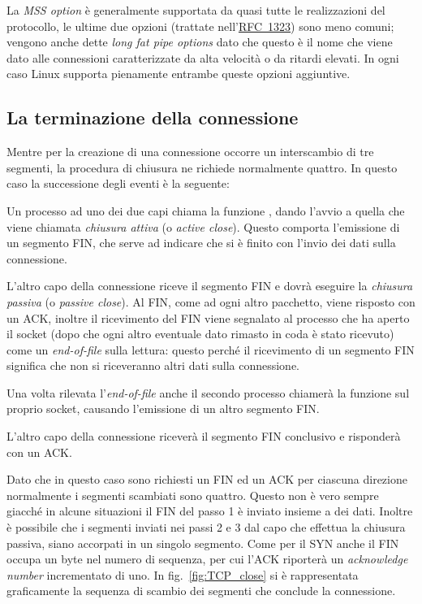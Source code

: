 La \textit{MSS option} è generalmente supportata da quasi tutte le
realizzazioni del protocollo, le ultime due opzioni (trattate
nell'\href{http://www.ietf.org/rfc/rfc1323.txt}{RFC~1323}) sono meno comuni;
vengono anche dette \textit{long fat pipe options} dato che questo è il nome
che viene dato alle connessioni caratterizzate da alta velocità o da ritardi
elevati. In ogni caso Linux supporta pienamente entrambe queste opzioni
aggiuntive.


\subsection{La terminazione della connessione}
\label{sec:TCP_conn_term}

Mentre per la creazione di una connessione occorre un interscambio di tre
segmenti, la procedura di chiusura ne richiede normalmente quattro. In questo
caso la successione degli eventi è la seguente:

\begin{enumerate*}
\item Un processo ad uno dei due capi chiama la funzione , dando
  l'avvio a quella che viene chiamata \textsl{chiusura attiva} (o
  \textit{active close}). Questo comporta l'emissione di un segmento FIN, che
  serve ad indicare che si è finito con l'invio dei dati sulla connessione.
  
\item L'altro capo della connessione riceve il segmento FIN e dovrà eseguire
  la \textsl{chiusura passiva} (o \textit{passive close}). Al FIN, come ad
  ogni altro pacchetto, viene risposto con un ACK, inoltre il ricevimento del
  FIN viene segnalato al processo che ha aperto il socket (dopo che ogni altro
  eventuale dato rimasto in coda è stato ricevuto) come un
  \textit{end-of-file} sulla lettura: questo perché il ricevimento di un
  segmento FIN significa che non si riceveranno altri dati sulla connessione.
  
\item Una volta rilevata l'\textit{end-of-file} anche il secondo processo
  chiamerà la funzione  sul proprio socket, causando l'emissione
  di un altro segmento FIN.

\item L'altro capo della connessione riceverà il segmento FIN conclusivo e
  risponderà con un ACK.
\end{enumerate*}

Dato che in questo caso sono richiesti un FIN ed un ACK per ciascuna direzione
normalmente i segmenti scambiati sono quattro.  Questo non è vero sempre
giacché in alcune situazioni il FIN del passo 1 è inviato insieme a dei dati.
Inoltre è possibile che i segmenti inviati nei passi 2 e 3 dal capo che
effettua la chiusura passiva, siano accorpati in un singolo segmento. Come per
il SYN anche il FIN occupa un byte nel numero di sequenza, per cui l'ACK
riporterà un \textit{acknowledge number} incrementato di uno. In
fig.~\ref{fig:TCP_close} si è rappresentata graficamente la sequenza di
scambio dei segmenti che conclude la connessione.

